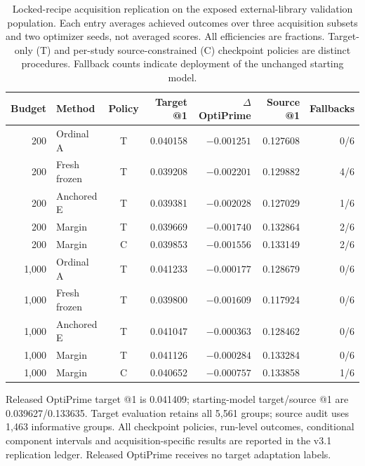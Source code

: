 \begin{table}[htbp]
\centering
\small
\caption{Locked-recipe acquisition replication on the exposed external-library validation population. Each entry averages achieved outcomes over three acquisition subsets and two optimizer seeds, not averaged scores. All efficiencies are fractions. Target-only (T) and per-study source-constrained (C) checkpoint policies are distinct procedures. Fallback counts indicate deployment of the unchanged starting model.}
\label{tab:v31-replication}
\begin{tabular}{rlcrrrr}
\toprule
Budget & Method & Policy & Target @1 & $\Delta$ OptiPrime & Source @1 & Fallbacks \\
\midrule
200 & Ordinal A & T & 0.040158 & $-0.001251$ & 0.127608 & 0/6 \\
200 & Fresh frozen & T & 0.039208 & $-0.002201$ & 0.129882 & 4/6 \\
200 & Anchored E & T & 0.039381 & $-0.002028$ & 0.127029 & 1/6 \\
200 & Margin & T & 0.039669 & $-0.001740$ & 0.132864 & 2/6 \\
200 & Margin & C & 0.039853 & $-0.001556$ & 0.133149 & 2/6 \\
\midrule
1,000 & Ordinal A & T & 0.041233 & $-0.000177$ & 0.128679 & 0/6 \\
1,000 & Fresh frozen & T & 0.039800 & $-0.001609$ & 0.117924 & 0/6 \\
1,000 & Anchored E & T & 0.041047 & $-0.000363$ & 0.128462 & 0/6 \\
1,000 & Margin & T & 0.041126 & $-0.000284$ & 0.133284 & 0/6 \\
1,000 & Margin & C & 0.040652 & $-0.000757$ & 0.133858 & 1/6 \\
\bottomrule
\end{tabular}
\par\smallskip
\begin{minipage}{0.98\textwidth}\footnotesize
Released OptiPrime target @1 is 0.041409; starting-model target/source @1 are 0.039627/0.133635.
Target evaluation retains all 5,561 groups; source audit uses 1,463 informative groups. All checkpoint policies, run-level outcomes, conditional component intervals and acquisition-specific results are reported in the v3.1 replication ledger. Released OptiPrime receives no target adaptation labels.
\end{minipage}
\end{table}
